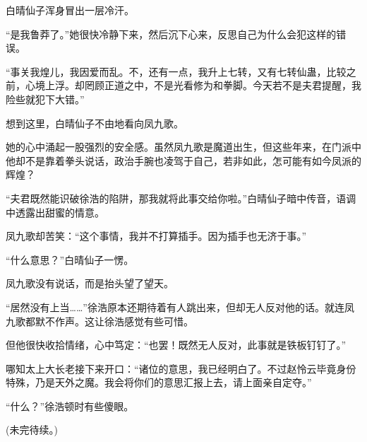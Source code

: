 \begin{this_body}
白晴仙子浑身冒出一层冷汗。

“是我鲁莽了。”她很快冷静下来，然后沉下心来，反思自己为什么会犯这样的错误。

“事关我煌儿，我因爱而乱。不，还有一点，我升上七转，又有七转仙蛊，比较之前，心境上浮。却罔顾正道之中，不是光看修为和拳脚。今天若不是夫君提醒，我险些就犯下大错。”

想到这里，白晴仙子不由地看向凤九歌。

她的心中涌起一股强烈的安全感。虽然凤九歌是魔道出生，但这些年来，在门派中他却不是靠着拳头说话，政治手腕也凌驾于自己，若非如此，怎可能有如今凤派的辉煌？

“夫君既然能识破徐浩的陷阱，那我就将此事交给你啦。”白晴仙子暗中传音，语调中透露出甜蜜的情意。

凤九歌却苦笑：“这个事情，我并不打算插手。因为插手也无济于事。”

“什么意思？”白晴仙子一愣。

凤九歌没有说话，而是抬头望了望天。

“居然没有上当……”徐浩原本还期待着有人跳出来，但却无人反对他的话。就连凤九歌都默不作声。这让徐浩感觉有些可惜。

但他很快收拾情绪，心中笃定：“也罢！既然无人反对，此事就是铁板钉钉了。”

哪知太上大长老接下来开口：“诸位的意思，我已经明白了。不过赵怜云毕竟身份特殊，乃是天外之魔。我会将你们的意思汇报上去，请上面亲自定夺。”

“什么？”徐浩顿时有些傻眼。

(未完待续。)

\end{this_body}

